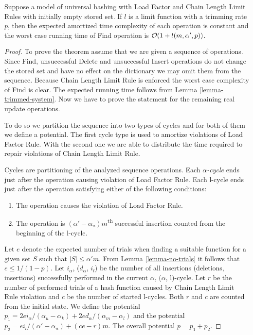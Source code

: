 \begin{theorem}
\label{theorem-amortised-expected-time}
Suppose a model of universal hashing with Load Factor and Chain Length Limit Rules with initially empty stored set. If $l$ is a limit function with a trimming rate $p$, then the expected amortized time complexity of each operation is constant and the worst case running time of Find operation is $\mathcal{O}(1 + l(m, \alpha', p))$.
\end{theorem}
\begin{proof}
To prove the theorem assume that we are given a sequence of operations. Since Find, unsuccessful Delete and unsuccessful Insert operations do not change the stored set and have no effect on the dictionary we may omit them from the sequence. Because Chain Length Limit Rule is enforced the worst case complexity of Find is clear. The expected running time follows from Lemma \ref{lemma-trimmed-system}. Now we have to prove the statement for the remaining real update operations.

To do so we partition the sequence into two types of cycles and for both of them we define a potential. The first cycle type is used to amortize violations of Load Factor Rule. With the second one we are able to distribute the time required to repair violations of Chain Length Limit Rule.

\begin{definition}
Cycles are partitioning of the analyzed sequence operations.
Each \emph{$\alpha$-cycle} ends just after the operation causing violation of Load Factor Rule.
Each l-cycle ends just after the operation satisfying either of the following conditions:
\begin{enumerate}
\item The operation causes the violation of Load Factor Rule.
\item The operation is $(\alpha' - \alpha_u) m$\textsuperscript{th} successful insertion counted from the beginning of the l-cycle.
\end{enumerate}
\end{definition}

Let $e$ denote the expected number of trials when finding a suitable function for a given set $S$ such that $|S| \leq \alpha'm$. From Lemma \ref{lemma-no-trials} it follows that $e \leq 1 / (1 - p)$. Let $i_{\alpha}$, ($d_\alpha$, $i_l$) be the number of all insertions (deletions, insertions) successfully performed in the current $\alpha$, ($\alpha$, l)-cycle. Let $r$ be the number of performed trials of a hash function caused by Chain Length Limit Rule violation and $c$ be the number of started l-cycles. Both $r$ and $c$ are counted from the initial state. We define the potential $p_1 = {2ei_{\alpha}}/{(\alpha_u - \alpha_k)} + {2ed_{\alpha}}/{(\alpha_m - \alpha_l)}$ and the potential $p_2 = {ei_{l}}/{(\alpha' - \alpha_u)} + (ce - r) m$.  The overall potential $p = p_1 + p_2$.


\end{proof}
